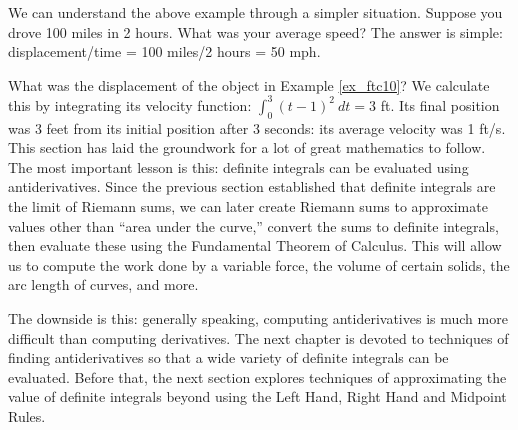 We can understand the above example through a simpler situation. Suppose you drove 100 miles in 2 hours. What was your average speed? The answer is simple: displacement/time = 100 miles/2 hours = 50 mph.

What was the displacement of the object in Example \ref{ex_ftc10}? We calculate this by integrating its velocity function: $\int_0^3 (t-1)^2\ dt = 3$ ft. Its final position was 3 feet from its initial position after 3 seconds: its average velocity was 1 ft/s.\\

This section has laid the groundwork for a lot of great mathematics to follow. The most important lesson is this: definite integrals can be evaluated using antiderivatives. Since the previous section established that definite integrals are the limit of Riemann sums, we can later create Riemann sums to approximate values other than ``area under the curve,'' convert the sums to definite integrals, then evaluate these using the Fundamental Theorem of Calculus. This will allow us to compute the work done by a variable force, the volume of certain solids, the arc length of curves, and more.

The downside is this: generally speaking, computing antiderivatives is much more difficult than computing derivatives. The next chapter is devoted to techniques of finding antiderivatives so that a wide variety of definite integrals can be evaluated. Before that, the next section explores techniques of approximating the value of definite integrals beyond using the Left Hand, Right Hand and Midpoint Rules.

